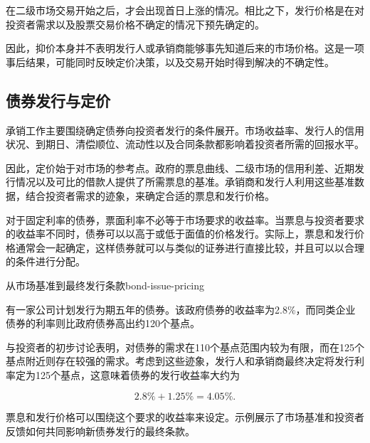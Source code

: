 \begin{tcolorbox}[
  enhanced,
  breakable,
  colback=white,
  colframe=FinanceBlue,
  boxrule=0.7pt,
  sharp corners,
  borderline west={2.2pt}{0pt}{FinanceBlue},
  title=\textbf{财务展望：盘后定价不足是一种结果现象},
  coltitle=white,
  colbacktitle=FinanceBlue,
  fonttitle=\bfseries,
  before skip=1.2em,
  after skip=1.2em
]

在二级市场交易开始之后，才会出现首日上涨的情况。相比之下，发行价格是在对投资者需求以及股票交易价格不确定的情况下预先确定的。

因此，抑价本身并不表明发行人或承销商能够事先知道后来的市场价格。这是一项事后结果，可能同时反映定价决策，以及交易开始时得到解决的不确定性。

\end{tcolorbox}

\subsection{债券发行与定价}

承销工作主要围绕确定债券向投资者发行的条件展开。市场收益率、发行人的信用状况、到期日、清偿顺位、流动性以及合同条款都影响着投资者所需的回报水平。

因此，定价始于对市场的参考点。政府的票息曲线、二级市场的信用利差、近期发行情况以及可比的借款人提供了所需票息的基准。承销商和发行人利用这些基准数据，结合投资者需求的迹象，来确定合适的票息和发行价格。

对于固定利率的债券，票面利率不必等于市场要求的收益率。当票息与投资者要求的收益率不同时，债券可以以高于或低于面值的价格发行。实际上，票息和发行价格通常会一起确定，这样债券就可以与类似的证券进行直接比较，并且可以以合理的条件进行分配。

\begin{example}{从市场基准到最终发行条款}{bond-issue-pricing}

有一家公司计划发行为期五年的债券。该政府债券的收益率为2.8\%，而同类企业债券的利率则比政府债券高出约120个基点。

与投资者的初步讨论表明，对债券的需求在110个基点范围内较为有限，而在125个基点附近则存在较强的需求。考虑到这些迹象，发行人和承销商最终决定将发行利率定为125个基点，这意味着债券的发行收益率大约为

\[
2.8\%+1.25\%=4.05\%.
\]

票息和发行价格可以围绕这个要求的收益率来设定。示例展示了市场基准和投资者反馈如何共同影响新债券发行的最终条款。

\end{example}

